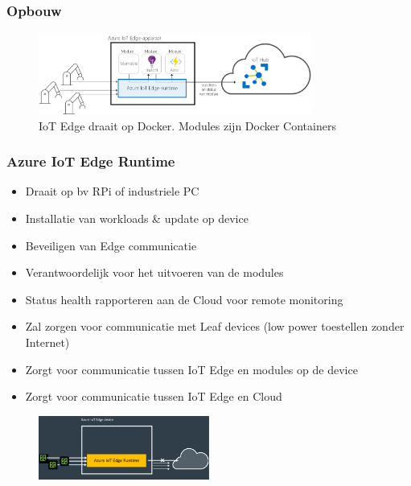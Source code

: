 \documentclass{article}
\begin{document}
\subsubsection{Opbouw}

\begin{figure}[H]
    \centering
    \includegraphics[width=0.8\textwidth]{iot-edge2.png}
    \caption{IoT Edge draait op Docker. Modules zijn Docker Containers}
\end{figure}

\subsubsection{Azure IoT Edge Runtime}

\begin{itemize}
    \item Draait op bv RPi of industriele PC
    \item Installatie van workloads \& update op device
    \item Beveiligen van Edge communicatie
    \item Verantwoordelijk voor het uitvoeren van de modules
    \item Status health rapporteren aan de Cloud voor remote monitoring
    \item Zal zorgen voor communicatie met Leaf devices (low power toestellen zonder Internet)
    \item Zorgt voor communicatie tussen IoT Edge en modules op de device
    \item Zorgt voor communicatie tussen IoT Edge en Cloud
\end{itemize}

\begin{figure}[H]
    \centering
    \includegraphics[width=0.5\textwidth]{iot-edge3.png}
    \caption{}
\end{figure}
\end{document}
